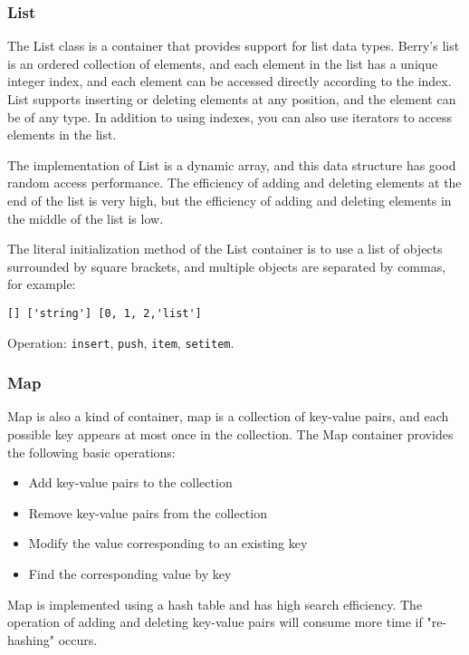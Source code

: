 \subsubsection{List}

The List class is a container that provides support for list data types. Berry's list is an ordered collection of elements, and each element in the list has a unique integer index, and each element can be accessed directly according to the index. List supports inserting or deleting elements at any position, and the element can be of any type. In addition to using indexes, you can also use iterators to access elements in the list.

The implementation of List is a dynamic array, and this data structure has good random access performance. The efficiency of adding and deleting elements at the end of the list is very high, but the efficiency of adding and deleting elements in the middle of the list is low.

The literal initialization method of the List container is to use a list of objects surrounded by square brackets, and multiple objects are separated by commas, for example:
\begin{lstlisting}[language=berry, numbers=none]
[] ['string'] [0, 1, 2,'list']
\end{lstlisting}

Operation: \texttt{insert}, \texttt{push}, \texttt{item}, \texttt{setitem}.

\subsubsection{Map}

Map is also a kind of container, map is a collection of key-value pairs, and each possible key appears at most once in the collection. The Map container provides the following basic operations:
\begin{itemize}
    \item Add key-value pairs to the collection
    \item Remove key-value pairs from the collection
    \item Modify the value corresponding to an existing key
    \item Find the corresponding value by key
\end{itemize}

Map is implemented using a hash table and has high search efficiency. The operation of adding and deleting key-value pairs will consume more time if "re-hashing" occurs.

